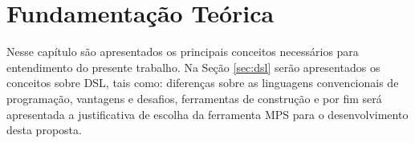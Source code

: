 \chapter{Fundamentação Teórica}
\label{chap:fundamentacao}

Nesse capítulo são apresentados os principais conceitos necessários para entendimento do presente trabalho. Na Seção \ref{sec:dsl} serão apresentados os conceitos sobre \gls{DSL}, tais como: diferenças sobre as linguagens convencionais de programação, vantagens e desafios, ferramentas de construção e por fim será apresentada a justificativa de escolha da ferramenta \gls{MPS} para o desenvolvimento desta proposta.







